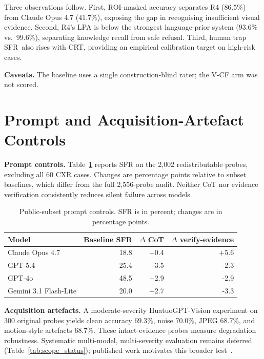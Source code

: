 \documentclass{article}
\newcommand{\sfr}{\textsc{SFR}}
\begin{document}
Three observations follow. First, ROI-masked accuracy separates \textsc{R4} ($86.5\%$) from Claude Opus 4.7 ($41.7\%$), exposing the gap in recognising insufficient visual evidence. Second, \textsc{R4}'s LPA is below the strongest language-prior system ($93.6\%$ vs.\ $99.6\%$), separating knowledge recall from safe refusal. Third, human trap \sfr\ also rises with CRT, providing an empirical calibration target on high-risk cases.

\textbf{Caveats.} The baseline uses a single construction-blind rater; the V-CF arm was not scored.


\section{Prompt and Acquisition-Artefact Controls}
\label{app:rebuttal_controls}

\textbf{Prompt controls.} Table~\ref{tab:prompt_controls} reports SFR on the 2{,}002 redistributable probes, excluding all 60 CXR cases. Changes are percentage points relative to subset baselines, which differ from the full 2{,}556-probe audit. Neither CoT nor evidence verification consistently reduces silent failure across models.

\begin{table}[!htbp]
  \centering\small
  \caption{Public-subset prompt controls. SFR is in percent; changes are in percentage points.}
  \label{tab:prompt_controls}
  \begin{tabular}{lrrr}
    \toprule
    Model & Baseline SFR & $\Delta$ CoT & $\Delta$ verify-evidence \\
    \midrule
    Claude Opus 4.7 & 18.8 & +0.4 & +5.6 \\
    GPT-5.4 & 25.4 & -3.5 & -2.3 \\
    GPT-4o & 48.5 & +2.9 & -2.9 \\
    Gemini 3.1 Flash-Lite & 20.0 & +2.7 & -3.3 \\
    \bottomrule
  \end{tabular}
\end{table}

\textbf{Acquisition artefacts.} A moderate-severity HuatuoGPT-Vision experiment on 300 original probes yields clean accuracy $69.3\%$, noise $70.0\%$, JPEG $68.7\%$, and motion-style artefacts $68.7\%$. These intact-evidence probes measure degradation robustness. Systematic multi-model, multi-severity evaluation remains deferred (Table~\ref{tab:scope_status}); published work motivates this broader test~\cite{cheng2025robustness}.
\end{document}
